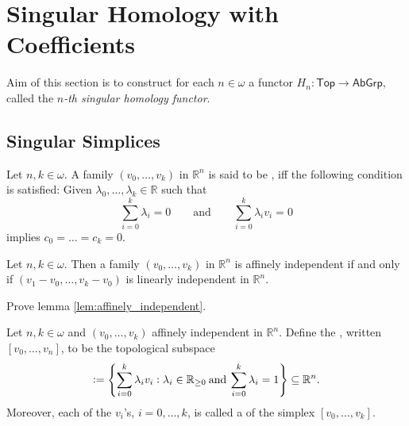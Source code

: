 \section*{Singular Homology with Coefficients}

Aim of this section is to construct for each $n \in \omega$ a functor $H_n : \mathsf{Top} \to \mathsf{AbGrp}$, called the \textit{$n$-th singular homology functor}.

\subsection*{Singular Simplices}

\begin{definition}
	Let $n,k \in \omega$. A family $(v_0,\dots,v_k)$ in $\mathbb{R}^n$ is said to be , iff the following condition is satisfied: Given $\lambda_0,\dots,\lambda_k \in \mathbb{R}$ such that
	\begin{equation*}
		\sum_{i = 0}^k \lambda_i = 0 \qquad \text{and} \qquad \sum_{i = 0}^k \lambda_i v_i = 0
	\end{equation*}
	\noindent implies $c_0 = \dots = c_k = 0$.
\end{definition}

\begin{lemma}
	\label{lem:affinely_independent}
	Let $n,k \in \omega$. Then a family $(v_0,\dots,v_k)$ in $\mathbb{R}^n$ is affinely independent if and only if $(v_1 - v_0,\dots,v_k - v_0)$ is linearly independent in $\mathbb{R}^n$.
\end{lemma}

\begin{exercise}
	\label{ex:affinely_independent}
	Prove lemma \ref{lem:affinely_independent}.
\end{exercise}

\begin{definition}[Simplex]
	\label{def:simplex}
	Let $n,k \in \omega$ and $(v_0,\dots,v_k)$ affinely independent in $\mathbb{R}^n$. Define the , written $[v_0,\dots,v_n]$, to be the topological subspace 
	\begin{equation*}
		[v_0,\dots,v_k] := \cbr[4]{\sum_{i = 0}^k \lambda_i v_i : \lambda_i \in \mathbb{R}_{\geq 0} \> \text{and} \> \sum_{i = 0}^k \lambda_i = 1} \subseteq \mathbb{R}^n.
	\end{equation*}
	Moreover, each of the $v_i$'s, $i = 0,\dots,k$, is called a  of the simplex $[v_0,\dots,v_k]$.
\end{definition}

